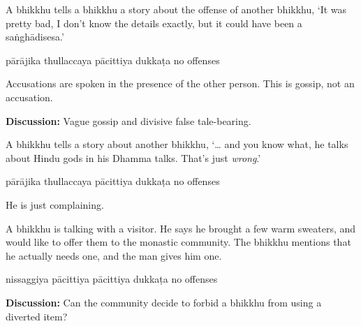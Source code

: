 \begin{exam}{\autoExamName}
\begin{problem*}
\begin{parts}
  \bigskip

\item A bhikkhu tells a bhikkhu a story about the offense of another bhikkhu,
  `It was pretty bad, I don't know the details exactly, but it could have been a
  saṅghādisesa.'

  \bigskip

  \begin{answers}{5}
    \bChoices
     pārājika\eAns
     thullaccaya\eAns
     pācittiya\eAns
     dukkaṭa\eAns
     no offenses\eAns
    \eChoices
  \end{answers}

  \begin{solution}
    Accusations are spoken in the presence of the other person.
    This is gossip, not an accusation.
  \end{solution}

  \bigskip

  \textbf{Discussion:} Vague gossip and divisive false tale-bearing.

  \bigskip

\item A bhikkhu tells a story about another bhikkhu, `\ldots{} and you know
  what, he talks about Hindu gods in his Dhamma talks. That's just
  \textit{wrong}.'

  \bigskip

  \begin{answers}{5}
    \bChoices
     pārājika\eAns
     thullaccaya\eAns
     pācittiya\eAns
     dukkaṭa\eAns
     no offenses\eAns
    \eChoices
  \end{answers}

  \begin{solution}
    He is just complaining.
  \end{solution}

  \bigskip

\item A bhikkhu is talking with a visitor. He says he brought a few warm
  sweaters, and would like to offer them to the monastic community. The bhikkhu
  mentions that he actually needs one, and the man gives him one.

  \bigskip

  \begin{answers}{4}
    \bChoices
     nissaggiya pācittiya\eAns
     pācittiya\eAns
     dukkaṭa\eAns
     no offenses\eAns
    \eChoices
  \end{answers}

  \bigskip

  \textbf{Discussion:} Can the community decide to forbid a bhikkhu from using a
  diverted item?

\end{parts}

\end{problem*}

\end{exam}
